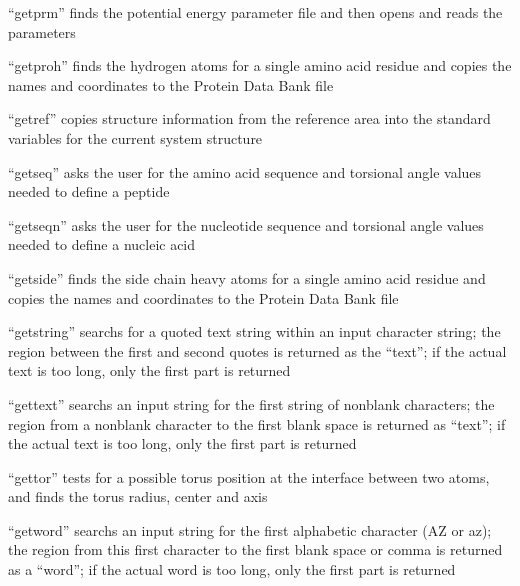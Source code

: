 \documentclass[letterpaper,11pt,english]{sphinxmanual}
\begin{document}

“getprm” finds the potential energy parameter file and then opens and reads the parameters


“getproh” finds the hydrogen atoms for a single amino acid residue and copies the names and coordinates to the Protein Data Bank file


“getref” copies structure information from the reference area into the standard variables for the current system structure


“getseq” asks the user for the amino acid sequence and torsional angle values needed to define a peptide


“getseqn” asks the user for the nucleotide sequence and torsional angle values needed to define a nucleic acid


“getside” finds the side chain heavy atoms for a single amino acid residue and copies the names and coordinates to the Protein Data Bank file


“getstring” searchs for a quoted text string within an input character string; the region between the first and second quotes is returned as the “text”; if the actual text is too long, only the first part is returned


“gettext” searchs an input string for the first string of non\sphinxhyphen{}blank characters; the region from a non\sphinxhyphen{}blank character to the first blank space is returned as “text”; if the actual text is too long, only the first part is returned


“gettor” tests for a possible torus position at the interface between two atoms, and finds the torus radius, center and axis


“getword” searchs an input string for the first alphabetic character (A\sphinxhyphen{}Z or a\sphinxhyphen{}z); the region from this first character to the first blank space or comma is returned as a “word”; if the actual word is too long, only the first part is returned
\end{document}
